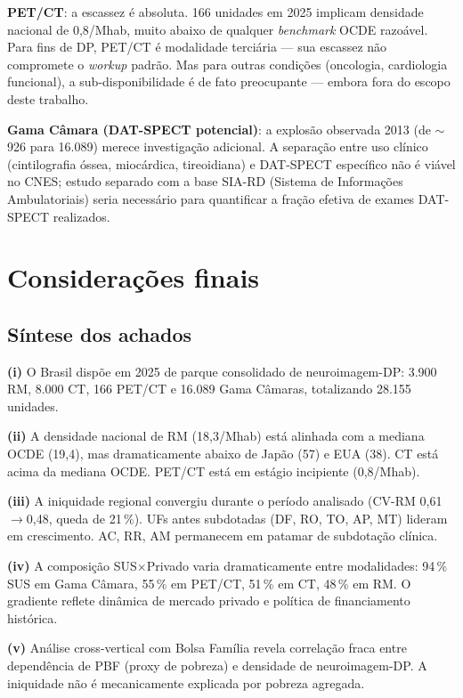 \documentclass[12pt,a4paper,oneside]{article}
\begin{document}
\textbf{PET/CT}: a escassez é absoluta. 166 unidades em 2025
implicam densidade nacional de 0,8/Mhab, muito abaixo de qualquer
\textit{benchmark} OCDE razoável. Para fins de DP, PET/CT é
modalidade terciária — sua escassez não compromete o
\textit{workup} padrão. Mas para outras condições (oncologia,
cardiologia funcional), a sub-disponibilidade é de fato preocupante
— embora fora do escopo deste trabalho.

\textbf{Gama Câmara (DAT-SPECT potencial)}: a explosão observada
2013 (de $\sim$926 para 16.089) merece investigação
adicional. A separação entre uso clínico (cintilografia óssea,
miocárdica, tireoidiana) e DAT-SPECT específico não é viável no
CNES; estudo separado com a base SIA-RD (Sistema de Informações
Ambulatoriais) seria necessário para quantificar a fração efetiva
de exames DAT-SPECT realizados.

\section{Considerações finais}\label{sec:conclusao}

\subsection{Síntese dos achados}

\textbf{(i)} O Brasil dispõe em 2025 de parque consolidado de
neuroimagem-DP: 3.900 RM, 8.000 CT, 166 PET/CT e 16.089 Gama
Câmaras, totalizando 28.155 unidades.

\textbf{(ii)} A densidade nacional de RM (18,3/Mhab) está alinhada
com a mediana OCDE (19,4), mas dramaticamente abaixo de Japão (57)
e EUA (38). CT está acima da mediana OCDE. PET/CT está em estágio
incipiente (0,8/Mhab).

\textbf{(iii)} A iniquidade regional convergiu durante o período
analisado (CV-RM 0,61$\rightarrow$0,48, queda de 21\,\%). UFs antes
subdotadas (DF, RO, TO, AP, MT) lideram em crescimento. AC, RR, AM
permanecem em patamar de subdotação clínica.

\textbf{(iv)} A composição SUS$\times$Privado varia dramaticamente
entre modalidades: 94\,\% SUS em Gama Câmara, 55\,\% em PET/CT,
51\,\% em CT, 48\,\% em RM. O gradiente reflete dinâmica de mercado
privado e política de financiamento histórica.

\textbf{(v)} Análise cross-vertical com Bolsa Família revela
correlação fraca entre dependência de PBF (proxy de pobreza) e
densidade de neuroimagem-DP. A iniquidade não é mecanicamente
explicada por pobreza agregada.
\end{document}
